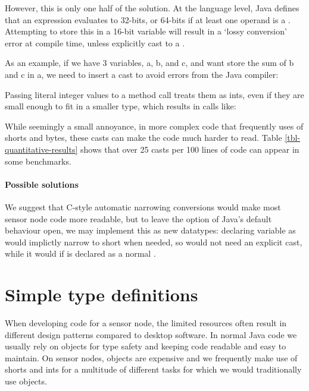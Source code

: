 However, this is only one half of the solution. At the language level, Java defines that an expression evaluates to 32-bits, or 64-bits if at least one operand is a . Attempting to store this in a 16-bit variable will result in a `lossy conversion' error at compile time, unless explicitly cast to a .

As an example, if we have 3  variables, a, b, and c, and want store the sum of b and c in a, we need to insert a cast to avoid errors from the Java compiler:


Passing literal integer values to a method call treats them as ints, even if they are small enough to fit in a smaller type, which results in calls like: 


While seemingly a small annoyance, in more complex code that frequently uses of shorts and bytes, these casts can make the code much harder to read. Table \ref{tbl-quantitative-results} shows that over 25 casts per 100 lines of code can appear in some benchmarks.

\paragraph{Possible solutions}

We suggest that C-style automatic narrowing conversions would make most sensor node code more readable, but to leave the option of Java's default behaviour open, we may implement this as new datatypes: declaring variable  as  would implictly narrow to short when needed, so  would not need an explicit cast, while it would if  is declared as a normal .




\section{Simple type definitions}
\label{sec-typedef}
When developing code for a sensor node, the limited resources often result in different design patterns compared to desktop software. In normal Java code we usually rely on objects for type safety and keeping code readable and easy to maintain. On sensor nodes, objects are expensive and we frequently make use of shorts and ints for a multitude of different tasks for which we would traditionally use objects.

